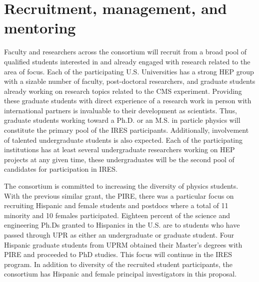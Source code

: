 
\section{Recruitment, management, and mentoring}

%
Faculty and researchers across the consortium will recruit from a
broad pool of qualified students interested in and already engaged
with research related to the area of focus. Each of the participating
U.S. Universities has a strong HEP group with a sizable number of
faculty, post-doctoral researchers, and graduate students already
working on research topics related to the CMS experiment. Providing
these graduate students with direct experience of a research work in
person with international partners is invaluable to their development
as scientists. Thus, graduate students working toward a Ph.D. or an
M.S. in particle physics will constitute the primary pool of the IRES
participants. Additionally, involvement of talented undergraduate
students is also expected. Each of the participating institutions has
at least several undergraduate researchers working on HEP projects at
any given time, these undergraduates will be the second pool of
candidates for participation in IRES.

%
The consortium is committed to increasing the diversity of physics
students.  
With the previous similar grant, the PIRE, there was a particular
focus on recruiting Hispanic and female students and postdocs where a
total of 11 minority and 10 females participated.  Eighteen percent of
the science and engineering Ph.Ds granted to Hispanics in the U.S. are
to students who have passed through UPR as either an undergraduate or
graduate student.  Four Hispanic graduate students from UPRM obtained
their Master's degrees with PIRE and proceeded to PhD studies. This
focus will continue in the IRES program. In addition to diversity of
the recruited student participants, the consortium has Hispanic and
female principal investigators in this proposal.

